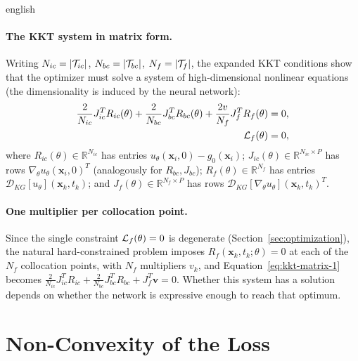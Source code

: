 \documentclass[../0000.tex]{subfiles}
\begin{document}
\begin{hyphenrules}{english}
\paragraph{The KKT system in matrix form.}
Writing $N_{ic}=\left\lvert \mathcal{T}_{ic} \right\rvert$, $N_{bc}=\left\lvert \mathcal{T}_{bc} \right\rvert$, $N_f=\left\lvert \mathcal{T}_f \right\rvert$, the expanded KKT conditions
show that the optimizer must solve a system of high-dimensional nonlinear equations (the
dimensionality is induced by the neural network):
\begin{align}
  \frac{2}{N_{ic}}J_{ic}^{T}R_{ic}(\theta)+\frac{2}{N_{bc}}J_{bc}^{T}R_{bc}(\theta)
  +\frac{2v}{N_f}J_f^{T}R_f(\theta)&=0, \label{eq:kkt-matrix-1}\\
  \mathcal{L}_f(\theta)&=0, \label{eq:kkt-matrix-2}
\end{align}
where $R_{ic}(\theta)\in\mathbb{R}^{N_{ic}}$ has entries $u_\theta(\mathbf{x}_i,0)-g_0(\mathbf{x}_i)$;
$J_{ic}(\theta)\in\mathbb{R}^{N_{ic}\times P}$ has rows $\nabla_\theta u_\theta(\mathbf{x}_i,0)^{T}$ (analogously for
$R_{bc},J_{bc}$); $R_f(\theta)\in\mathbb{R}^{N_f}$ has entries $\mathcal{D}_{KG}[u_\theta](\mathbf{x}_k,t_k)$; and
$J_f(\theta)\in\mathbb{R}^{N_f\times P}$ has rows $\mathcal{D}_{KG}[\nabla_\theta u_\theta](\mathbf{x}_k,t_k)^{T}$.

\paragraph{One multiplier per collocation point.}
Since the single constraint $\mathcal{L}_f(\theta)=0$ is degenerate (Section~\ref{sec:optimization}), the natural
hard-constrained problem imposes $R_f(\mathbf{x}_k,t_k;\theta)=0$ at each of the $N_f$ collocation points,
with $N_f$ multipliers $v_k$, and Equation~\eqref{eq:kkt-matrix-1} becomes
$\frac{2}{N_{ic}}J_{ic}^{T}R_{ic}+\frac{2}{N_{bc}}J_{bc}^{T}R_{bc}+J_f^{T}\mathbf{v}=0$. Whether this
system has a solution depends on whether the network is expressive enough to reach that optimum.

\section{Non-Convexity of the Loss}\label{app-sec:nonconvexity}


\end{hyphenrules}
\end{document}
